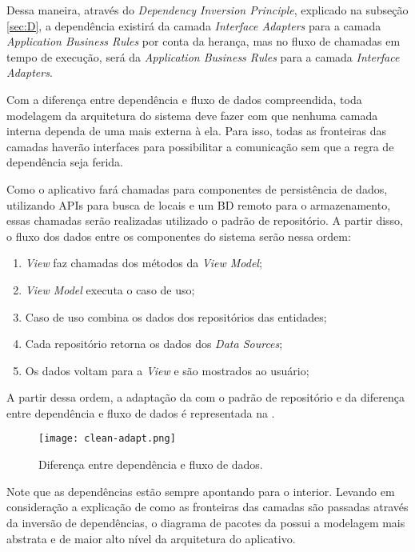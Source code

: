 Dessa maneira, através do \textit{Dependency Inversion Principle}, explicado na subseção \ref{sec:D}, a dependência existirá da camada \textit{Interface Adapters} para a camada \textit{Application Business Rules} por conta da herança, mas no fluxo de chamadas em tempo de execução, será da \textit{Application Business Rules} para a camada \textit{Interface Adapters}.

Com a diferença entre dependência e fluxo de dados compreendida, toda modelagem da arquitetura do sistema deve fazer com que nenhuma camada interna dependa de uma mais externa à ela. Para isso, todas as fronteiras das camadas haverão interfaces para possibilitar a comunicação sem que a regra de dependência seja ferida.

Como o aplicativo fará chamadas para componentes de persistência de dados, utilizando APIs para busca de locais e um BD remoto para o armazenamento, essas chamadas serão realizadas utilizado o padrão de repositório. A partir disso, o fluxo dos dados entre os componentes do sistema serão nessa ordem:

\begin{enumerate}
  \item \textit{View} faz chamadas dos métodos da \textit{View Model};
  \item \textit{View Model} executa o caso de uso;
  \item Caso de uso combina os dados dos repositórios das entidades;
  \item Cada repositório retorna os dados dos \textit{Data Sources};
  \item Os dados voltam para a \textit{View} e são mostrados ao usuário;
\end{enumerate}

A partir dessa ordem, a adaptação da  com o padrão de repositório e da diferença entre dependência e fluxo de dados é representada na .

\begin{figure}[!htb]
  \centering
  \texttt{[image: clean-adapt.png]}
  \caption{Diferença entre dependência e fluxo de dados.}
  \label{fig:cleanadapt}
\end{figure}

Note que as dependências estão sempre apontando para o interior. Levando em consideração a explicação de como as fronteiras das camadas são passadas através da inversão de dependências, o diagrama de pacotes da  possui a modelagem mais abstrata e de maior alto nível da arquitetura do aplicativo. 

